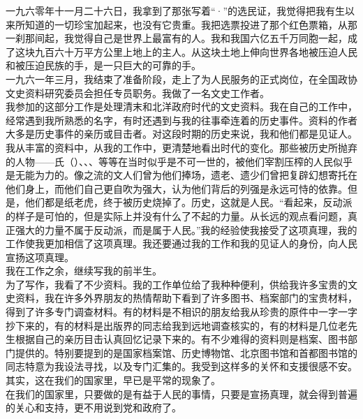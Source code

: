 一九六零年十一月二十六日，我拿到了那张写着“·”的选民证，我觉得把我有生以来所知道的一切珍宝加起来，也没有它贵重。我把选票投进了那个红色票箱，从那一刹那间起，我觉得自己是世界上最富有的人。我和我国六亿五千万同胞一起，成了这块九百六十万平方公里上地上的主人。从这块土地上伸向世界各地被压迫人民和被压迫民族的手，是一只巨大的可靠的手。\\

一九六一年三月，我结束了准备阶段，走上了为人民服务的正式岗位，在全国政协文史资料研究委员会担任专员职务。我做了一名文史工作者。\\

我参加的这部分工作是处理清末和北洋政府时代的文史资料。我在自己的工作中，经常遇到我所熟悉的名字，有时还遇到与我的往事牵连着的历史事件。资料的作者大多是历史事件的亲历或目击者。对这段时期的历史来说，我和他们都是见证人。我从丰富的资料中，从我的工作中，更清楚地看出时代的变化。那些被历史所抛弃的人物——氏（）、、、等等在当时似乎是不可一世的，被他们宰割压榨的人民似乎是无能为力的。像之流的文人们曾为他们捧场，遗老、遗少们曾把复辟幻想寄托在他们身上，而他们自己更自吹为强大，认为他们背后的列强是永远可恃的依靠。但是，他们都是纸老虎，终于被历史烧掉了。历史，这就是人民。“看起来，反动派的样子是可怕的，但是实际上并没有什么了不起的力量。从长远的观点看问题，真正强大的力量不属于反动派，而是属于人民。”我的经验使我接受了这项真理，我的工作使我更加相信了这项真理。我还要通过我的工作和我的见证人的身份，向人民宣扬这项真理。\\

我在工作之余，继续写我的前半生。\\

为了写作，我看了不少资料。我的工作单位给了我种种便利，供给我许多宝贵的文史资料，我在许多外界朋友的热情帮助下看到了许多图书、档案部门的宝贵材料，得到了许多专门调查材料。有的材料是不相识的朋友给我从珍贵的原件中一字一字抄下来的，有的材料是出版界的同志给我到远地调查核实的，有的材料是几位老先生根据自己的亲历目击认真回忆记录下来的。有不少难得的资料则是档案、图书部门提供的。特别要提到的是国家档案馆、历史博物馆、北京图书馆和首都图书馆的同志特意为我设法寻找，以及专门汇集的。我受到这样多的关怀和支援很感不安。其实，这在我们的国家里，早已是平常的现象了。\\

在我们的国家里，只要做的是有益于人民的事情，只要是宣扬真理，就会得到普遍的关心和支持，更不用说到党和政府了。\\


